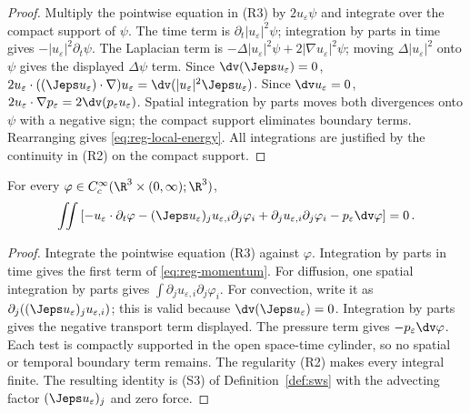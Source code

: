 \documentclass[11pt,reqno]{amsart}
\begin{document}
\begin{proof}
Multiply the pointwise equation in (R3) by $2u_\varepsilon\psi$ and
integrate over the compact support of $\psi$. The time term is
$\partial_t|u_\varepsilon|^2\psi$; integration by parts in time gives
$-|u_\varepsilon|^2\partial_t\psi$. The Laplacian term is
$-\Delta|u_\varepsilon|^2\psi+2|\nabla u_\varepsilon|^2\psi$; moving
$\Delta|u_\varepsilon|^2$ onto $\psi$ gives the displayed $\Delta\psi$
term. Since $\dv(\Jeps u_\varepsilon)=0$,
$2u_\varepsilon\cdot((\Jeps u_\varepsilon)\cdot\nabla)u_\varepsilon
=\dv(|u_\varepsilon|^2\Jeps u_\varepsilon)$. Since
$\dv u_\varepsilon=0$,
$2u_\varepsilon\cdot\nabla p_\varepsilon=2\dv(p_\varepsilon u_\varepsilon)$.
Spatial integration by parts moves both divergences onto $\psi$ with a
negative sign; the compact support eliminates boundary terms. Rearranging
gives \eqref{eq:reg-local-energy}. All integrations are justified by the
continuity in (R2) on the compact support.
\end{proof}

\begin{lemma}\label{lem:reg-momentum}
For every $\varphi\in C_c^\infty(\R^3\times(0,\infty);\R^3)$,
\begin{equation}\label{eq:reg-momentum}
  \iint\left[-u_\varepsilon\cdot\partial_t\varphi
  -(\Jeps u_\varepsilon)_j u_{\varepsilon,i}\partial_j\varphi_i
  +\partial_j u_{\varepsilon,i}\partial_j\varphi_i
  -p_\varepsilon\dv\varphi\right]=0\,.
\end{equation}
\end{lemma}

\begin{proof}
Integrate the pointwise equation (R3) against $\varphi$. Integration by
parts in time gives the first term of \eqref{eq:reg-momentum}. For
diffusion, one spatial integration by parts gives
$\int\partial_j u_{\varepsilon,i}\partial_j\varphi_i$. For convection,
write it as $\partial_j((\Jeps u_\varepsilon)_j u_{\varepsilon,i})$;
this is valid because $\dv(\Jeps u_\varepsilon)=0$. Integration by parts
gives the negative transport term displayed. The pressure term gives
$-p_\varepsilon\dv\varphi$. Each test is compactly supported in the open
space-time cylinder, so no spatial or temporal boundary term remains. The
regularity (R2) makes every integral finite. The resulting identity is
(S3) of Definition~\ref{def:sws} with the advecting factor
$(\Jeps u_\varepsilon)_j$ and zero force.
\end{proof}
\end{document}
